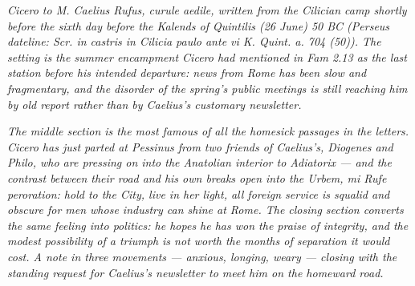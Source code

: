 
\textit{Cicero to M. Caelius Rufus, curule aedile,
written from the Cilician camp shortly before the sixth
day before the Kalends of Quintilis (26 June) 50 BC
(Perseus dateline: \textit{Scr. in castris in Cilicia
paulo ante vi K. Quint. a. 704 (50)}). The setting is
the summer encampment Cicero had mentioned in
\textit{Fam} 2.13 as the last station before his
intended departure: news from Rome has been slow and
fragmentary, and the disorder of the spring's public
meetings is still reaching him by old report rather
than by Caelius's customary newsletter.}

\textit{The middle section is the most famous of all
the homesick passages in the letters. Cicero has just
parted at Pessinus from two friends of Caelius's,
Diogenes and Philo, who are pressing on into the
Anatolian interior to Adiatorix --- and the contrast
between their road and his own breaks open into the
\textit{Urbem, mi Rufe} peroration: hold to the City,
live in her light, all foreign service is squalid and
obscure for men whose industry can shine at Rome.
The closing section converts the same feeling into
politics: he hopes he has won the praise of integrity,
and the modest possibility of a triumph is not worth
the months of separation it would cost. A note in three
movements --- anxious, longing, weary --- closing with
the standing request for Caelius's newsletter to meet
him on the homeward road.}
